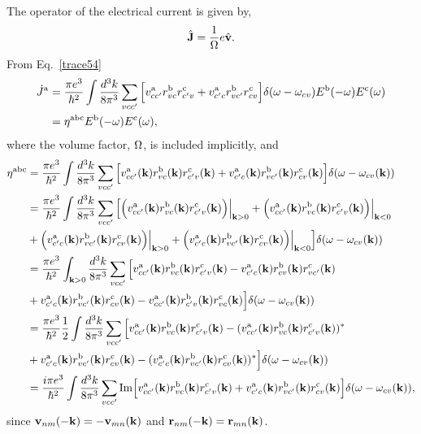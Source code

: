 \documentclass[floatfix,prb,aps,superscriptaddress,11pt]{revtex4}
\begin{document}
The operator of the electrical current is given by,
\begin{align}\label{ec.1}
\hat{\mathbf{J}}=\frac{1}{\Omega}e\hat{\mathbf{v}}
.
\end{align}
From Eq.~\eqref{trace54}
\begin{align}\label{ec.2}
\dot J^{\mathrm{a}}  
&=
\frac{\pi e^3}{\hbar^2}
\int\frac{d^3k}{8\pi^3}
\sum_{vcc'}
\Big[ 
v^{\mathrm{a}}_{cc'}r^{\mathrm{b}}_{vc} r^{\mathrm{c}}_{c'v}
+ 
v^{\mathrm{a}}_{c'c}r^{\mathrm{b}}_{vc'} r^{\mathrm{c}}_{cv}
\Big]
\delta(\omega-\omega_{cv})  
E^{\mathrm{b}}(-\omega) E^{\mathrm{c}}(\omega) 
\nonumber\\
&=
\eta^{\mathrm{a}\mathrm{b}\mathrm{c}} 
E^{\mathrm{b}}(-\omega) E^{\mathrm{c}}(\omega) 
,
\end{align} 
where the volume factor, $\Omega$, is included implicitly, and
\begin{align}\label{ec.3}
\eta^{\mathrm{a}\mathrm{b}\mathrm{c}} 
&=
\frac{\pi e^3}{\hbar^2}
\int\frac{d^3k}{8\pi^3}
\sum_{vcc'}
\Big[ 
v^{\mathrm{a}}_{cc'}(\mathbf{k}) r^{\mathrm{b}}_{vc}(\mathbf{k}) r^{\mathrm{c}}_{c'v}(\mathbf{k}) 
+
v^{\mathrm{a}}_{c'c}(\mathbf{k}) r^{\mathrm{b}}_{vc'}(\mathbf{k}) r^{\mathrm{c}}_{cv}(\mathbf{k}) 
\Big]
\delta(\omega-\omega_{cv}(\mathbf{k})) 
\nonumber\\
&=
\frac{\pi e^3}{\hbar^2}
\int\frac{d^3k}{8\pi^3}
\sum_{vcc'}
\Big[ 
\Big(v^{\mathrm{a}}_{cc'}(\mathbf{k}) r^{\mathrm{b}}_{vc}(\mathbf{k}) r^{\mathrm{c}}_{c'v}(\mathbf{k}) \Big)\Big|_{\mathbf{k}>0} 
+
\Big(v^{\mathrm{a}}_{cc'}(\mathbf{k}) r^{\mathrm{b}}_{vc}(\mathbf{k}) r^{\mathrm{c}}_{c'v}(\mathbf{k})\Big)\Big|_{\mathbf{k}<0} 
\nonumber\\
&+
\Big(v^{\mathrm{a}}_{c'c}(\mathbf{k}) r^{\mathrm{b}}_{vc'}(\mathbf{k}) r^{\mathrm{c}}_{cv}(\mathbf{k})\Big)\Big|_{\mathbf{k}>0} 
+
\Big(v^{\mathrm{a}}_{c'c}(\mathbf{k}) r^{\mathrm{b}}_{vc'}(\mathbf{k}) r^{\mathrm{c}}_{cv}(\mathbf{k})\Big)\Big|_{\mathbf{k}<0} 
\Big]
\delta(\omega-\omega_{cv}(\mathbf{k})) 
\nonumber\\
&=
\frac{\pi e^3}{\hbar^2}
\int_{\mathbf{k}>0}
\frac{d^3k}{8\pi^3}
\sum_{vcc'}
\Big[ 
v^{\mathrm{a}}_{cc'}(\mathbf{k}) r^{\mathrm{b}}_{vc}(\mathbf{k}) r^{\mathrm{c}}_{c'v}(\mathbf{k}) 
-
v^{\mathrm{a}}_{c'c}(\mathbf{k}) r^{\mathrm{b}}_{cv}(\mathbf{k}) r^{\mathrm{c}}_{vc'}(\mathbf{k}) 
\nonumber\\
&+
v^{\mathrm{a}}_{c'c}(\mathbf{k}) r^{\mathrm{b}}_{vc'}(\mathbf{k}) r^{\mathrm{c}}_{cv}(\mathbf{k}) 
-
v^{\mathrm{a}}_{cc'}(\mathbf{k}) r^{\mathrm{b}}_{c'v}(\mathbf{k}) r^{\mathrm{c}}_{vc}(\mathbf{k}) 
\Big]
\delta(\omega-\omega_{cv}(\mathbf{k})) 
\nonumber\\
&=
\frac{\pi e^3}{\hbar^2}
\frac{1}{2}
\int
\frac{d^3k}{8\pi^3}
\sum_{vcc'}
\Big[ 
v^{\mathrm{a}}_{cc'}(\mathbf{k}) r^{\mathrm{b}}_{vc}(\mathbf{k}) r^{\mathrm{c}}_{c'v}(\mathbf{k}) 
-
(v^{\mathrm{a}}_{cc'}(\mathbf{k}) r^{\mathrm{b}}_{vc}(\mathbf{k}) r^{\mathrm{c}}_{c'v}(\mathbf{k}))^*
\nonumber\\
&+
v^{\mathrm{a}}_{c'c}(\mathbf{k}) r^{\mathrm{b}}_{vc'}(\mathbf{k}) r^{\mathrm{c}}_{cv}(\mathbf{k}) 
-
(v^{\mathrm{a}}_{c'c}(\mathbf{k}) r^{\mathrm{b}}_{vc'}(\mathbf{k}) r^{\mathrm{c}}_{cv}(\mathbf{k}) )^*
\Big]
\delta(\omega-\omega_{cv}(\mathbf{k})) 
\nonumber\\
&=
\frac{i\pi e^3}{\hbar^2}
\int\frac{d^3k}{8\pi^3}
\sum_{vcc'}
\mathrm{Im}\Big[ 
v^{\mathrm{a}}_{cc'}(\mathbf{k}) r^{\mathrm{b}}_{vc}(\mathbf{k}) r^{\mathrm{c}}_{c'v}(\mathbf{k}) 
+
v^{\mathrm{a}}_{c'c}(\mathbf{k}) r^{\mathrm{b}}_{vc'}(\mathbf{k}) r^{\mathrm{c}}_{cv}(\mathbf{k}) 
\Big]
\delta(\omega-\omega_{cv}(\mathbf{k})) 
,
\end{align}
 since $\mathbf{v}_{nm}(-\mathbf{k})=-\mathbf{v}_{mn}(\mathbf{k})$ and 
$\mathbf{r}_{nm}(-\mathbf{k})=\mathbf{r}_{mn}(\mathbf{k})$.
\end{document}
